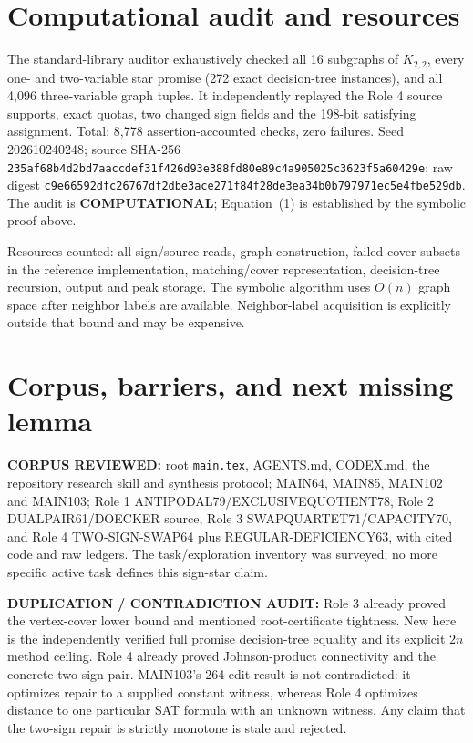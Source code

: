 \documentclass[11pt]{article}
\begin{document}
\section{Computational audit and resources}
The standard-library auditor exhaustively checked all 16 subgraphs of
$K_{2,2}$, every one- and two-variable star promise (272 exact decision-tree
instances), and all 4,096 three-variable graph tuples. It independently
replayed the Role 4 source supports, exact quotas, two changed sign fields and
the 198-bit satisfying assignment. Total: 8,778 assertion-accounted checks,
zero failures. Seed 202610240248; source SHA-256
\texttt{235af68b4d2bd7aaccdef31f426d93e388fd80e89c4a905025c3623f5a60429e};
raw digest
\texttt{c9e66592dfc26767df2dbe3ace271f84f28de3ea34b0b797971ec5e4fbe529db}.
The audit is \textbf{COMPUTATIONAL}; Equation~(1) is established by the
symbolic proof above.

Resources counted: all sign/source reads, graph construction, failed cover
subsets in the reference implementation, matching/cover representation,
decision-tree recursion, output and peak storage. The symbolic algorithm
uses $O(n)$ graph space after neighbor labels are available. Neighbor-label
acquisition is explicitly outside that bound and may be expensive.

\section{Corpus, barriers, and next missing lemma}
\textbf{CORPUS REVIEWED:} root \texttt{main.tex}, AGENTS.md, CODEX.md,
the repository research skill and synthesis protocol; MAIN64, MAIN85,
MAIN102 and MAIN103; Role 1 ANTIPODAL79/EXCLUSIVEQUOTIENT78, Role 2
DUALPAIR61/DOECKER source, Role 3 SWAPQUARTET71/CAPACITY70, and Role 4
TWO-SIGN-SWAP64 plus REGULAR-DEFICIENCY63, with cited code and raw ledgers.
The task/exploration inventory was surveyed; no more specific active task
defines this sign-star claim.

\textbf{DUPLICATION / CONTRADICTION AUDIT:} Role 3 already proved the
vertex-cover lower bound and mentioned root-certificate tightness. New here
is the independently verified full promise decision-tree equality and its
explicit $2n$ method ceiling. Role 4 already proved Johnson-product
connectivity and the concrete two-sign pair. MAIN103's 264-edit result is
not contradicted: it optimizes repair to a supplied constant witness, whereas
Role 4 optimizes distance to one particular SAT formula with an unknown
witness. Any claim that the two-sign repair is strictly monotone is stale and
rejected.
\end{document}
